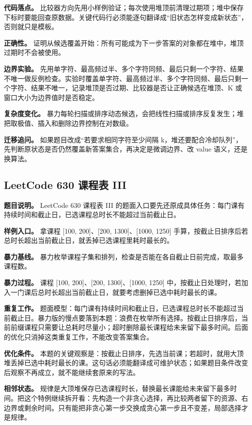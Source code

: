 \textbf{代码落点。} 比较器方向先用小样例验证；每次使用堆顶前清理过期项；堆中保存下标时要能回查原数据。关键代码行必须能逐句翻译成“旧状态怎样变成新状态”，否则就只是模板。

\textbf{正确性。} 证明从候选覆盖开始：所有可能成为下一步答案的对象都在堆中，堆顶过期时不会被使用。

\textbf{边界实验。} 先用单字符、最高频过半、多个字符同频、最后只剩一个字符、结果不唯一做反例检查。实验时覆盖单字符、最高频过半、多个字符同频、最后只剩一个字符、结果不唯一，记录堆顶是否过期、比较器是否让正确候选在堆顶、K 或窗口大小为边界值时是否稳定。

\textbf{复杂度变化。} 暴力每轮扫描或排序动态候选，会把线性扫描或排序反复发生；堆把取极值、插入和删除边界控制在对数级。

\textbf{迁移追问。} 如果题目改成“若要求相同字符至少间隔 k，堆还要配合冷却队列”，先判断原状态是否仍然覆盖新答案集合，再决定是微调边界、改 value 语义，还是换算法。

\subsection{LeetCode 630 课程表 III}

\textbf{题目说明。} LeetCode 630 课程表 III 的题面入口要先还原成具体任务：每门课有持续时间和截止日，已选课程总时长不能超过当前截止日。

\textbf{样例入口。} 拿课程 [100, 200]、[200, 1300]、[1000, 1250] 手算，按截止日排序后若总时长超出当前截止日，就丢掉已选课程里耗时最长的。

\textbf{暴力基线。} 暴力枚举课程子集和排列，检查是否能在各自截止日前完成，取最多课程数。

\textbf{暴力过程。} 课程 [100, 200]、[200, 1300]、[1000, 1250] 中，按截止日处理时，若加入一门课后总时长超出当前截止日，就要考虑删掉已选中耗时最长的课。

\textbf{重复工作。} 题面模型：每门课有持续时间和截止日，已选课程总时长不能超过当前截止日。暴力版的慢点要落到本题：浪费在枚举所有选择。按截止日排序后，当前前缀课程只需要让总耗时尽量小；超时删除最长课程给未来留下最多时间。后面的优化只消掉这类重复工作，不能改变答案集合。

\textbf{优化条件。} 本题的关键观察是：按截止日排序，先选当前课；若超时，就用大顶堆丢掉已选中耗时最长的课。这句话必须能翻译成可维护状态；如果题目条件改变后观察不再成立，就不能继续套原来的写法。

\textbf{相邻状态。} 规律是大顶堆保存已选课程时长，替换最长课能给未来留下最多时间。把这个特例继续拆开看：先构造一个非贪心选择，再比较两者留下的资源、右边界或剩余时间。只有能把非贪心第一步交换成贪心第一步且不变差，局部选择才是规律。

